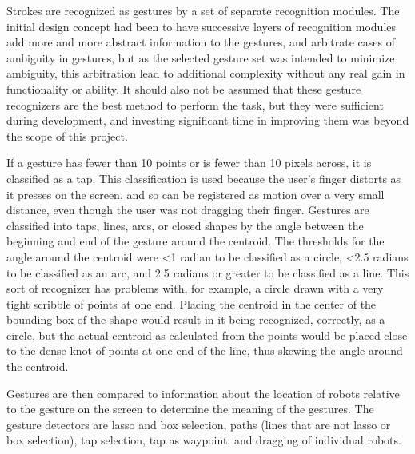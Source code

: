 Strokes are recognized as gestures by a set of separate recognition modules. 
The initial design concept had been to have successive layers of recognition modules add more and more abstract information to the gestures, and arbitrate cases of ambiguity in gestures, but as the selected gesture set was intended to minimize ambiguity, this arbitration lead to additional complexity without any real gain in functionality or ability. 
It should also not be assumed that these gesture recognizers are the best method to perform the task, but they were sufficient during development, and investing significant time in improving them was beyond the scope of this project. 

If a gesture has fewer than 10 points or is fewer than 10 pixels across, it is classified as a tap. 
This classification is used because the user's finger distorts as it presses on the screen, and so can be registered as motion over a very small distance, even though the user was not dragging their finger. 
Gestures are classified into taps, lines, arcs, or closed shapes by the angle between the beginning and end of the gesture around the centroid. 
The thresholds for the angle around the centroid were \textless 1 radian to be classified as a circle, \textless 2.5 radians to be classified as an arc, and 2.5 radians or greater to be classified as a line. 
This sort of recognizer has problems with, for example, a circle drawn with a very tight scribble of points at one end. Placing the centroid in the center of the bounding box of the shape would result in it being recognized, correctly, as a circle, but the actual centroid as calculated from the points would be placed close to the dense knot of points at one end of the line, thus skewing the angle around the centroid. 

Gestures are then compared to information about the location of robots relative to the gesture on the screen to determine the meaning of the gestures. 
The gesture detectors are lasso and box selection, paths (lines that are not lasso or box selection), tap selection, tap as waypoint, and dragging of individual robots. 

